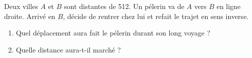 

\begin{exercice} \label{exo:deplac}\label{exo004}
Deux villes $A$ et $B$ sont distantes de \unit{512}{\kilo\meter}. Un pélerin va de $A$ vers $B$ en ligne droite. Arrivé en $B$, décide de rentrer chez lui et refait le trajet en sens inverse.
\begin{enumerate}
\item Quel déplacement aura fait le pélerin durant son long voyage ?
\item Quelle distance aura-t-il marché ?
\end{enumerate}
\end{exercice}
